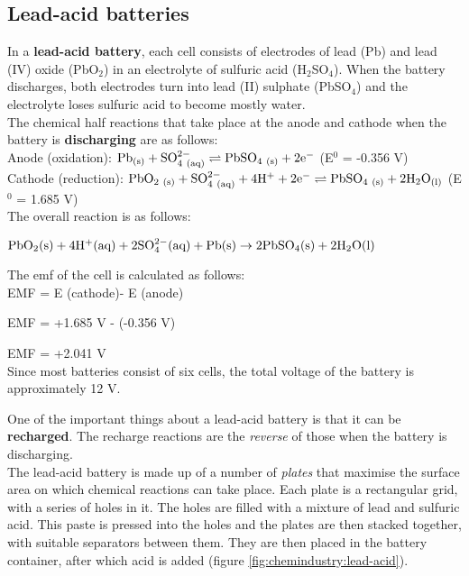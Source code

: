 \subsection{Lead-acid batteries}

In a \textbf{lead-acid battery}, each cell consists of electrodes of lead (Pb) and lead (IV) oxide (PbO$_{2}$) in an electrolyte of sulfuric acid (H$_{2}$SO$_{4}$). When the battery discharges, both electrodes turn into lead (II) sulphate (PbSO$_{4}$) and the electrolyte loses sulfuric acid to become mostly water.\\

The chemical half reactions that take place at the anode and cathode when the battery is \textbf{discharging} are as follows:\\

Anode (oxidation): $\rm{Pb_{(s)} + SO_{4\ (aq)}^{2-} \rightleftharpoons PbSO_{4\ (s)} + 2e^{-}}$ (E$^{0}$ = -0.356 V)\\



Cathode (reduction): $\rm{PbO_{2\ (s)} + SO_{4\ (aq)}^{2-} + 4H^{+} + 2e^{-} \rightleftharpoons PbSO_{4\ (s)}+ 2H_{2}O_{(l)}}$ (E$^{0}$ = 1.685 V)\\


The overall reaction is as follows:

\begin{center}
$\rm{PbO_{2}(s) + 4H^{+}(aq) + 2SO_{4}^{2-}(aq) + Pb(s) \rightarrow 2PbSO_{4}(s) + 2H_{2}O(l)}$
\end{center}

The emf of the cell is calculated as follows:\\


EMF = E (cathode)- E (anode)

EMF = +1.685 V - (-0.356 V)

EMF = +2.041 V\\

Since most batteries consist of six cells, the total voltage of the battery is approximately 12 V.

One of the important things about a lead-acid battery is that it can be \textbf{recharged}. The recharge reactions are the \textit{reverse} of those when the battery is discharging.\\

The lead-acid battery is made up of a number of \textit{plates} that maximise the surface area on which chemical reactions can take place. Each plate is a rectangular grid, with a series of holes in it. The holes are filled with a mixture of lead and sulfuric acid. This paste is pressed into the holes and the plates are then stacked together, with suitable separators between them. They are then placed in the battery container, after which acid is added (figure \ref{fig:chemindustry:lead-acid}).

